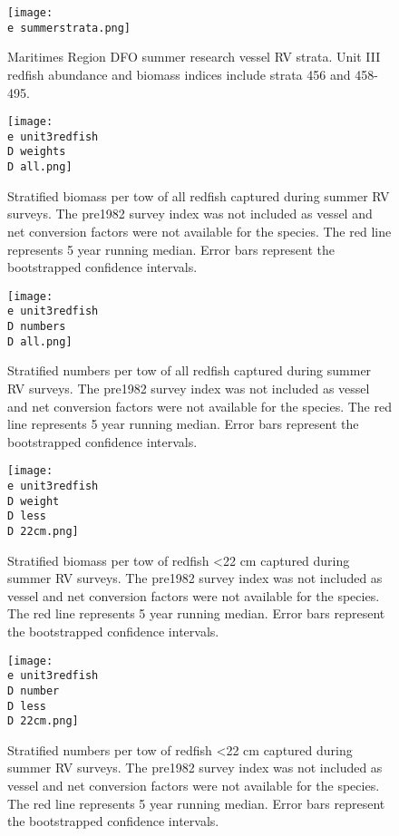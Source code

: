 \documentclass[11pt]{article}
\newcommand{\D}{.}
\newcommand{\e}{/home/ecomod_data/redfish/figures/}
\begin{document}
\begin{figure}
    
    \texttt{[image: \\e summerstrata.png]}
    \caption{Maritimes Region DFO summer research vessel RV strata. Unit III redfish abundance and biomass indices include strata 456 and 458-495.}

\end{figure}
\clearpage

\begin{figure}
\centering
    
    \texttt{[image: \\e unit3redfish\\D weights\\D all.png]}
    \caption{Stratified biomass per tow of all redfish captured during summer RV surveys. The pre1982 survey index was not included as vessel and net conversion factors were not available for the species. The red line represents 5 year running median. Error bars represent the bootstrapped confidence intervals.}

\end{figure}
\clearpage

\begin{figure}
\centering
    
    \texttt{[image: \\e unit3redfish\\D numbers\\D all.png]}
    \caption{Stratified numbers per tow of all redfish captured during summer RV surveys. The pre1982 survey index was not included as vessel and net conversion factors were not available for the species. The red line represents 5 year running median. Error bars represent the bootstrapped confidence intervals.}

\end{figure}
\clearpage

\begin{figure}
\centering
    
    \texttt{[image: \\e unit3redfish\\D weight\\D less\\D 22cm.png]}
    \caption{Stratified biomass per tow of redfish \textless 22 cm captured during summer RV surveys. The pre1982 survey index was not included as vessel and net conversion factors were not available for the species. The red line represents 5 year running median. Error bars represent the bootstrapped confidence intervals.}

\end{figure}
%
%
\begin{figure}
\centering
    
    \texttt{[image: \\e unit3redfish\\D number\\D less\\D 22cm.png]}
    \caption{Stratified numbers per tow of redfish \textless 22 cm  captured during summer RV surveys. The pre1982 survey index was not included as vessel and net conversion factors were not available for the species. The red line represents 5 year running median. Error bars represent the bootstrapped confidence intervals.}

\end{figure}
\clearpage
\end{document}
